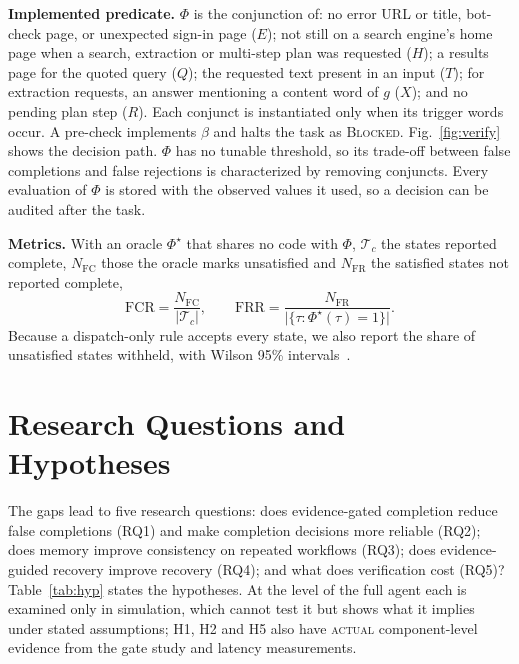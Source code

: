 \documentclass[conference]{IEEEtran}
\newcommand{\status}[1]{\textsc{#1}}
\begin{document}
\textbf{Implemented predicate.} $\Phi$ is the conjunction of: no error URL or title, bot-check page, or unexpected sign-in page ($E$); not still on a search engine's home page when a search, extraction or multi-step plan was requested ($H$); a results page for the quoted query ($Q$); the requested text present in an input ($T$); for extraction requests, an answer mentioning a content word of $g$ ($X$); and no pending plan step ($R$). Each conjunct is instantiated only when its trigger words occur. A pre-check implements $\beta$ and halts the task as \textsc{Blocked}. Fig.~\ref{fig:verify} shows the decision path. $\Phi$ has no tunable threshold, so its trade-off between false completions and false rejections is characterized by removing conjuncts. Every evaluation of $\Phi$ is stored with the observed values it used, so a decision can be audited after the task.



\textbf{Metrics.} With an oracle $\Phi^{\star}$ that shares no code with $\Phi$, $\mathcal{T}_c$ the states reported complete, $N_{\mathrm{FC}}$ those the oracle marks unsatisfied and $N_{\mathrm{FR}}$ the satisfied states not reported complete,
\begin{equation}
\mathrm{FCR} = \frac{N_{\mathrm{FC}}}{\lvert\mathcal{T}_c\rvert}, \qquad
\mathrm{FRR} = \frac{N_{\mathrm{FR}}}{\lvert\{\tau:\Phi^{\star}(\tau)=1\}\rvert}.
\end{equation}
Because a dispatch-only rule accepts every state, we also report the share of unsatisfied states withheld, with Wilson 95\% intervals~\cite{wilson1927probable}.

\section{Research Questions and Hypotheses}

The gaps lead to five research questions: does evidence-gated completion reduce false completions (RQ1) and make completion decisions more reliable (RQ2); does memory improve consistency on repeated workflows (RQ3); does evidence-guided recovery improve recovery (RQ4); and what does verification cost (RQ5)? Table~\ref{tab:hyp} states the hypotheses. At the level of the full agent each is examined only in simulation, which cannot test it but shows what it implies under stated assumptions; H1, H2 and H5 also have \status{actual} component-level evidence from the gate study and latency measurements.
\end{document}
